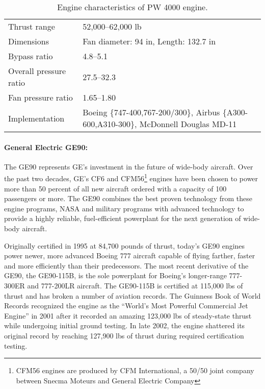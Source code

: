 \begin{table}[!htb!]
  \centering
\begin{tabular}{|p{}|p{}|}\hline
Thrust range& 52,000--62,000 lb\\
Dimensions & Fan diameter: 94 in, Length: 132.7 in\\
Bypass ratio& 4.8--5.1\\
Overall pressure ratio & 27.5--32.3\\
Fan pressure ratio&  1.65--1.80\\
Implementation& Boeing \{747-400,767-200/300\},  Airbus \{A300-600,A310-300\}, McDonnell Douglas MD-11\\\hline
\end{tabular}
  \caption{\label{TAB_PW4000}Engine characteristics of PW 4000 engine.}
\end{table}

\paragraph{General Electric GE90:}
The GE90 represents GE's investment in the future of wide-body aircraft. Over the past two decades, GE's CF6 and CFM56\footnote{CFM56 engines are produced by CFM International, a 50/50 joint company between Snecma Moteurs and General Electric Company} engines have been chosen to power more than 50 percent of all new aircraft ordered with a capacity of 100 passengers or more. The GE90 combines the best proven technology from these engine programs, NASA and military programs with advanced technology to provide a highly reliable, fuel-efficient powerplant for the next generation of wide-body aircraft.

Originally certified in 1995 at 84,700 pounds of thrust, today's GE90 engines power newer, more advanced Boeing 777 aircraft capable of flying farther, faster and more efficiently than their predecessors. The most recent derivative of the GE90, the GE90-115B, is the sole powerplant for Boeing's longer-range 777-300ER and 777-200LR aircraft. The GE90-115B is certified at 115,000 lbs of thrust and has broken a number of aviation records. The Guinness Book of World Records recognized the engine as the ``World's Most Powerful Commercial
Jet Engine'' in 2001 after it recorded an amazing 123,000 lbs of steady-state thrust while undergoing initial ground testing. In late 2002, the engine shattered its original record by reaching 127,900 lbs of thrust during required certification testing.

